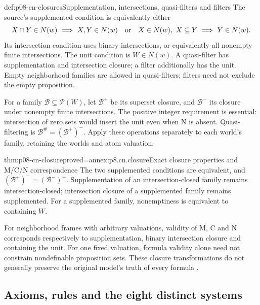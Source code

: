\begin{hbdefinition}{def:p08-cn-closures}{Supplementation, intersections, quasi-filters and filters}
The source's supplemented condition is equivalently either
\[
 X\cap Y\in N(w)\ \Longrightarrow\ X,Y\in N(w)
 \quad\hbox{or}\quad
 X\in N(w),\ X\subseteq Y\ \Longrightarrow\ Y\in N(w).
\]
Its intersection condition uses binary intersections, or equivalently
all nonempty finite intersections. The unit condition is \(W\in N(w)\).
A quasi-filter has supplementation and intersection closure; a filter
additionally has the unit. Empty neighborhood families are allowed in
quasi-filters; filters need not exclude the empty proposition.

For a family \(\mathcal B\subseteq\mathcal P(W)\), let
\(\mathcal B^+\) be its superset closure, and
\(\mathcal B^-\) its closure under nonempty finite intersections.
The positive integer requirement is essential: intersection of zero
sets would insert the unit even when N is absent.
Quasi-filtering is \(\mathcal B^\#=(\mathcal B^+)^-\).
Apply these operations separately to each world's family, retaining
the worlds and atom valuation.
\end{hbdefinition}

\begin{hbtheorem}{thm:p08-cn-closure}{proved=annex:p8.cn.closure}{Exact closure properties and M/C/N correspondence}
The two supplemented conditions are equivalent, and
\((\mathcal B^+)^-=(\mathcal B^-)^+\).
Supplementation of an intersection-closed family remains
intersection-closed; intersection closure of a supplemented family
remains supplemented. For a supplemented family, nonemptiness is
equivalent to containing \(W\).

For neighborhood frames with arbitrary valuations, validity of M,
C and N corresponds respectively to supplementation, binary
intersection closure and containing the unit. For one fixed valuation,
formula validity alone need not constrain nondefinable proposition sets.
These closure transformations do not generally preserve the original
model's truth of every formula
\cite[secs.~7.1--7.2, pp.~207--219]{Chellas1980}.
\end{hbtheorem}

\subsection{Axioms, rules and the eight distinct systems}
\label{sec:p08-cn-systems}

